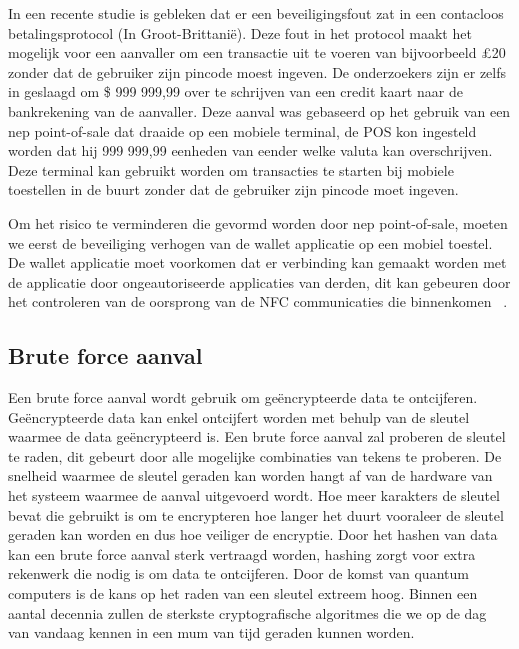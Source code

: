 In een recente studie is gebleken dat er een beveiligingsfout zat in een contacloos betalingsprotocol (In Groot-Brittanië). Deze fout in het protocol maakt het mogelijk voor een aanvaller om een transactie uit te voeren van bijvoorbeeld £20 zonder dat de gebruiker zijn pincode moest ingeven. De onderzoekers zijn er zelfs in geslaagd om \$ 999 999,99 over te schrijven van een credit kaart naar de bankrekening van de aanvaller. Deze aanval was gebaseerd op het gebruik van een nep point-of-sale dat draaide op een mobiele terminal, de POS kon ingesteld worden dat hij 999 999,99 eenheden van eender welke valuta kan overschrijven. Deze terminal kan gebruikt worden om transacties te starten bij mobiele toestellen in de buurt zonder dat de gebruiker zijn pincode moet ingeven.

Om het risico te verminderen die gevormd worden door nep point-of-sale, moeten we eerst de beveiliging verhogen van de wallet applicatie op een mobiel toestel. De wallet applicatie moet voorkomen dat er verbinding kan gemaakt worden met de applicatie door ongeautoriseerde applicaties van derden, dit kan gebeuren door het controleren van de oorsprong van de NFC communicaties die binnenkomen ~\autocite{Cavallari2014}. 


\subsection{Brute force aanval}
Een brute force aanval wordt gebruik om geëncrypteerde data te ontcijferen. Geëncrypteerde data kan enkel ontcijfert worden met behulp van de sleutel waarmee de data geëncrypteerd is. Een brute force aanval zal proberen de sleutel te raden, dit gebeurt door alle mogelijke combinaties van tekens te proberen. De snelheid waarmee de sleutel geraden kan worden hangt af van de hardware van het systeem waarmee de aanval uitgevoerd wordt. Hoe meer karakters de sleutel bevat die gebruikt is om te encrypteren hoe langer het duurt vooraleer de sleutel geraden kan worden en dus hoe veiliger de encryptie. Door het hashen van data kan een brute force aanval sterk vertraagd worden, hashing zorgt voor extra rekenwerk die nodig is om data te ontcijferen. Door de komst van quantum computers is de kans op het raden van een sleutel extreem hoog. Binnen een aantal decennia zullen de sterkste cryptografische algoritmes die we op de dag van vandaag kennen in een mum van tijd geraden kunnen worden.

